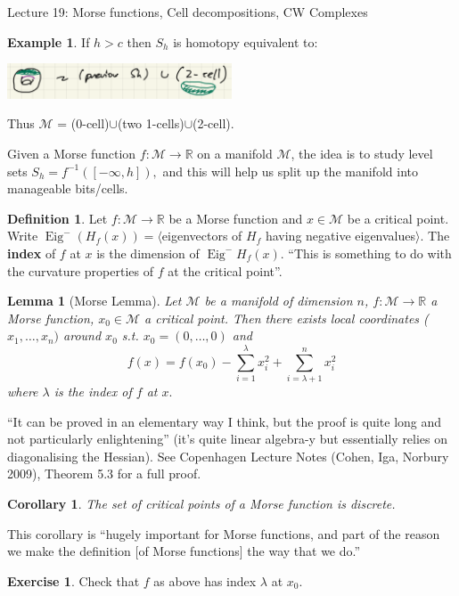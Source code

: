 \documentclass[10pt]{article}
\theoremstyle{plain}
\newtheorem{corollary}[thm]{Corollary}
\newtheorem{lemma}[thm]{Lemma}
\theoremstyle{definition}
\newtheorem{defn}[thm]{Definition} %
\newtheorem{exmp}[thm]{Example} %
\newtheorem{exercise}[thm]{Exercise}
\newcommand{\Real}{\mathbb{R}}
\newcommand{\man}{\mathcal{M}}
\newcommand{\xman}{x\in\man}
\newcommand{\sumfromto}[2]{\sum\limits_{#1}^{#2}}
\DeclareMathOperator{\Eig}{Eig}
\begin{document}
\begin{section}{Lecture 19: Morse functions, Cell decompositions, CW Complexes}
\begin{exmp}
    If $h>c$ then $S_h$ is homotopy equivalent to:
    \begin{center}
        \includegraphics[width=0.5\textwidth]{MorseTorusHomotopyFullTorus.png}
    \end{center}
    Thus $\man$ = (0-cell)$\cup$(two 1-cells)$\cup$(2-cell).
\end{exmp}
Given a Morse function $f : \man \to \Real$ on a manifold $\man$, the idea is to study level sets $S_h = f^{-1}([-\infty,h]),$ and this will help us split up the manifold into manageable bits/cells.

\begin{defn}
    Let $f:\man \to\Real$ be a Morse function and $\xman$ be a critical point. Write $\Eig^-(H_f(x)) = \langle $eigenvectors of $H_f$ having negative eigenvalues$\rangle$. The \textbf{index} of $f$ at $x$ is the dimension of $\Eig^-H_f(x)$. ``This is something to do with the curvature properties of $f$ at the critical point''.
\end{defn}

\begin{lemma}[Morse Lemma]\label{lem:MorseLemma}
    Let $\man$ be a manifold of dimension $n$, $f:\man \to \Real$ a Morse function, $x_0 \in \man$ a critical point. Then there exists local coordinates ($x_1,\ldots,x_n)$ around $x_0$ s.t. $x_0 = (0,\ldots,0)$ and 
    $$f(x) = f(x_0) - \sumfromto{i=1}{\lambda} x_i^2 + \sumfromto{i=\lambda+1}{n} x_i^2$$
    where $\lambda$ is the index of $f$ at $x.$
\end{lemma}
``It can be proved in an elementary way I think, but the proof is quite long and not particularly enlightening'' (it's quite linear algebra-y but essentially relies on diagonalising the Hessian). See Copenhagen Lecture Notes (Cohen, Iga, Norbury 2009), Theorem 5.3 for a full proof.

\begin{corollary}
    The set of critical points of a Morse function is discrete.
\end{corollary}\noindent
This corollary is ``hugely important for Morse functions, and part of the reason we make the definition [of Morse functions] the way that we do.''

\begin{exercise}
    Check that $f$ as above has index $\lambda$ at $x_0$.
\end{exercise}


\end{section}
\end{document}
